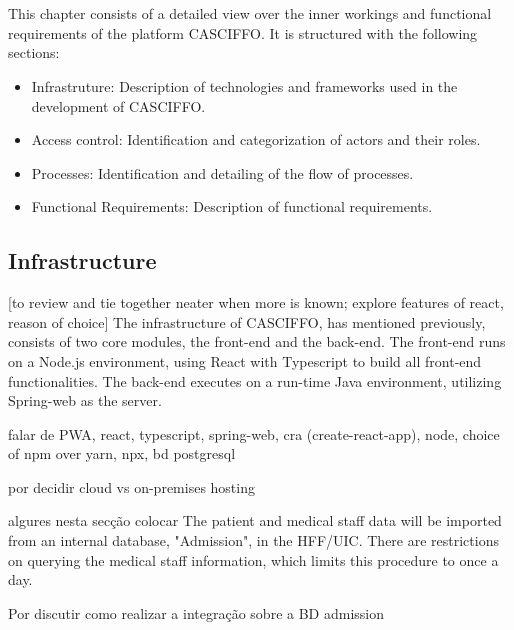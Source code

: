 \chapter{}
This chapter consists of a detailed view over the inner workings and functional requirements of the platform CASCIFFO.
It is structured with the following sections:
\begin{itemize}
    \item Infrastruture: Description of technologies and frameworks used in the development of CASCIFFO. 
    \item Access control: Identification and categorization of actors and their roles.
    \item Processes: Identification and detailing of the flow of processes.
    \item Functional Requirements: Description of functional requirements.
\end{itemize}


\section{Infrastructure} [to review and tie together neater when more is known; explore features of react, reason of choice]
The infrastructure of CASCIFFO, has mentioned previously, consists of two core modules, the front-end and the back-end.  
The front-end runs on a Node.js environment, using React with Typescript to build all front-end functionalities.  
The back-end executes on a run-time Java environment, utilizing Spring-web as the server.


falar de PWA, react, typescript, spring-web, cra (create-react-app), node, choice of npm over yarn, npx, bd postgresql  

por decidir cloud vs on-premises hosting  

algures nesta secção colocar  
The patient and medical staff data will be imported from an internal database, "Admission", in the HFF/UIC. There are restrictions on querying the medical staff information, which limits this procedure to once a day.

Por discutir  
como realizar a integração sobre a BD admission

